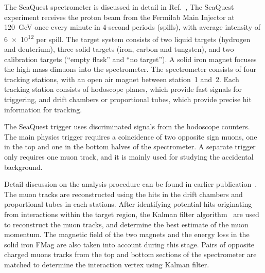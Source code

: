 \documentclass[reprint,aps,unsortedaddress,superscriptaddress,prl,floatfix,showpacs,linenumbers,final]{revtex4-2}
\begin{document}
The SeaQuest spectrometer is  discussed in detail in Ref.~\cite{aidala2019},
The SeaQuest experiment receives the  proton beam from the Fermilab Main Injector at \SI{120}{\GeV}
once every minute in 4-second periods (spills), with average intensity of \num{6e12} per spill.
The target system consists of two liquid targets (hydrogen and deuterium),
three solid targets (iron, carbon and tungsten), and two calibration targets (``empty flask'' and ``no target'').
A solid iron magnet focuses the high mass dimuons into the spectrometer.
The spectrometer consists of four tracking stations, with an open air magnet between station~1 and~2.
Each tracking station consists of hodoscope planes, which provide fast signals for triggering,
and drift chambers or proportional tubes, which provide precise hit information for tracking.

The SeaQuest trigger uses discriminated signals from the hodoscope counters.
The main physics trigger requires a coincidence of two opposite sign muons,
one in the top and one in the bottom halves of the spectrometer.
A separate trigger only requires one muon track, and it is mainly used for studying the accidental background.

Detail discussion on the analysis procedure can be found in earlier publication~\cite{dove2021,dove2023}.
The muon tracks are reconstructed using the hits in the drift chambers and proportional tubes in each stations.
After identifying potential hits originating from interactions within the target region,
the Kalman filter algorithm~\cite{kalman1960} are used to reconstruct the muon tracks,
and determine the best estimate of the muon momentum.
The magnetic field of the two magnets and the energy loss in the solid iron FMag are also taken into account during this stage.
Pairs of opposite charged muons tracks from the top and bottom sections of the spectrometer are
matched to determine the interaction vertex using Kalman filter.
\end{document}
